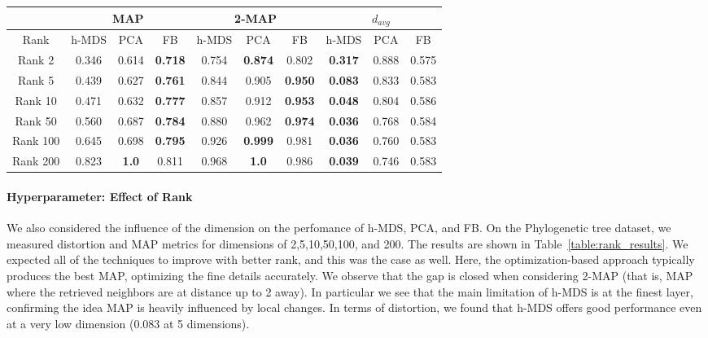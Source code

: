 \begin{table*}[]
\centering
\begin{tabular}{|c||c|c|c||c|c|c||c|c|c|}
\hline   
& \multicolumn{3}{c|}{MAP} &   \multicolumn{3}{c|}{2-MAP} &  \multicolumn{3}{c|}{$d_{avg}$}  \\ \hline
Rank       & h-MDS    & PCA      & FB      & h-MDS    & PCA      &  FB  & h-MDS    & PCA   & FB \\    \hline     \hline
Rank 2    & 0.346      &  0.614  &  {\bf 0.718}         & 0.754      &  {\bf 0.874}  &       0.802       & {\bf0.317}     &0.888  & 0.575  \\ \hline
Rank 5    & 0.439      & 0.627   &  {\bf 0.761}         & 0.844      &   0.905 & {\bf 0.950}       &{\bf 0.083}      &0.833 &  0.583 \\ \hline
Rank 10  & 0.471      & 0.632   &  {\bf 0.777}        & 0.857      &   0.912 &  {\bf 0.953}      & {\bf 0.048}      &0.804  & 0.586\\  \hline
Rank 50  & 0.560      & 0.687   &  {\bf 0.784}          & 0.880      &  0.962  &  {\bf 0.974}      & {\bf 0.036}     &0.768 & 0.584 \\ \hline
Rank 100 &0.645      & 0.698   &   {\bf 0.795}        & 0.926      &  {\bf 0.999}  &   0.981     &  {\bf 0.036}     &0.760 & 0.583 \\ \hline
Rank 200 &0.823      & {\bf 1.0}       &   0.811           & 0.968      & {\bf 1.0}      &   0.986      & {\bf 0.039}      & 0.746 & 0.583\\ \hline
\end{tabular}
\caption{Phylogenetic tree dataset.  Variation with rank, measured with MAP, 2-MAP, and $d_{avg}$. }
\label{table:rank_results}
\end{table*}

\paragraph*{Hyperparameter: Effect of Rank}
We also considered the influence of the dimension on the perfomance of
h-MDS, PCA, and FB. On the Phylogenetic tree dataset, we measured
distortion and MAP metrics for dimensions of 2,5,10,50,100, and
200. The results are shown in Table~\ref{table:rank_results}. We
expected all of the techniques to improve with better rank, and this
was the case as well. Here, the optimization-based approach typically
produces the best MAP, optimizing the fine details accurately. We
observe that the gap is closed when considering 2-MAP (that is, MAP
where the retrieved neighbors are at distance up to 2 away). In
particular we see that the main limitation of h-MDS is at the finest
layer, confirming the idea MAP is heavily influenced by local
changes. In terms of distortion, we found that h-MDS offers
good performance even at a very low dimension ($0.083$ at 5 dimensions).

